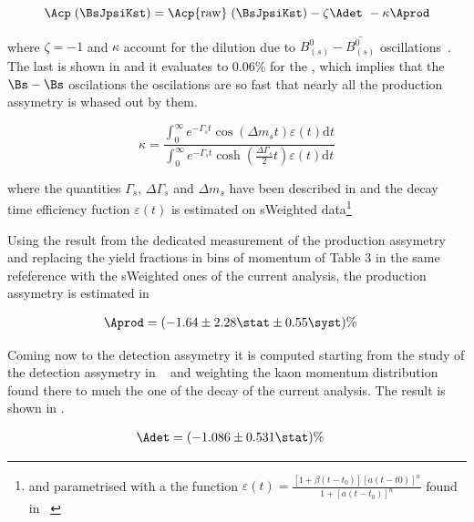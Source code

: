 \begin{equation}
\Acp\;(\BsJpsiKst) = \Acp{\rm raw}\;(\BsJpsiKst) - \zeta \Adet\ - \kappa\Aprod
\label{acp_corrected}
\end{equation}

\noindent where $\zeta = -1$ and $\kappa$ account for the dilution due to $B^0_{(s)}-\bar{B^0_{(s)}}$ 
oscillations~\cite{LHCb-PAPER-2013-018}. The last is shown in  and it evaluates to $0.06\%$ for the \BsJpsiKst, 
which implies that the $\Bs-\Bs$ oscilations the oscilations are so fast that nearly all the production assymetry
is whased out by them.

\begin{equation}
 \kappa = \frac{\int_0^\infty  e^{-\Gamma_s t} \cos \!\left( \Delta m_s t \right ) \varepsilon(t)\mathrm{d}t}{\int_0^\infty  e^{-\Gamma_s t} \cosh \left( \frac{\Delta \Gamma_s}{2} t \right ) \varepsilon(t)\mathrm{d}t}
\label{kappa}
\end{equation}

\noindent where the quantities $\Gamma_s$, $\Delta\Gamma_s$ and $\Delta m_s$ have been described in 
and the decay time efficiency fuction $\varepsilon(t)$ is estimated on sWeighted \BsJpsiKst 
data\footnote{and parametrised with a the function $\varepsilon(t)= \frac{[1+\beta(t-t_0)][a(t-t0)]^n}{1+[a(t-t_0)]^n}$ found in ~\cite{LHCb-PAPER-2014-053}}

Using the result from the dedicated \lhcb measurement of the production assymetry ~\cite{LHCb-PAPER-2014-042}
and replacing the \BJpsiKst yield fractions in bins of \Bs momentum of Table 3 in the same refeference with the sWeighted \BsJpsiKst ones of the current analysis, 
the production assymetry is estimated in 

\begin{align}
\Aprod &= (-1.64 \pm 2.28 \stat \pm 0.55 \syst)\%
\label{prod_assym}
\end{align}

\noindent Coming now to the detection assymetry it is computed starting from the \lhcb study of the detection assymetry
in ~\cite{LHCb-PAPER-2014-013} and weighting the kaon momentum distribution found there to much the one of the \BsJpsiKst
decay of the current analysis. The result is shown in .

\begin{align}
\Adet &= (-1.086 \pm 0.531 \stat)\%
\label{det_assym}
\end{align}
 


